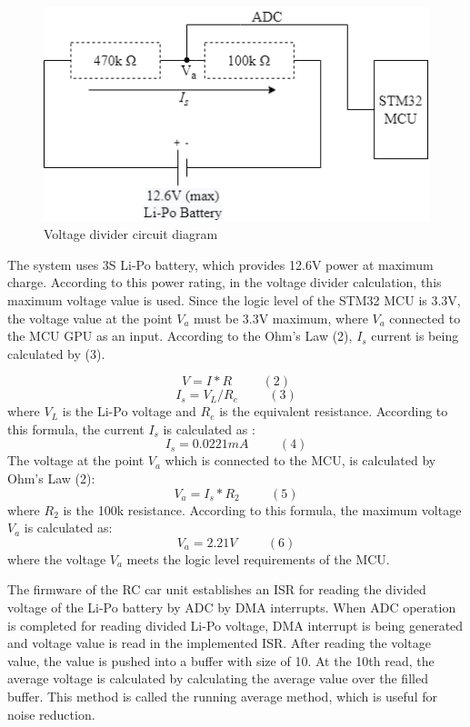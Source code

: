 \begin{figure}[!htbp]
    \centering
\includegraphics[width=1\textwidth]{Imgs/voltage_divider.drawio.png}
    \caption{\label{fig:voltage_divider_circuit}Voltage divider circuit diagram}
\end{figure}

The system uses 3S Li-Po battery, which provides 12.6V power at maximum charge. According to this power rating, in the voltage divider calculation, this maximum voltage value is used. Since the logic level of the STM32 MCU is 3.3V, the voltage value at the point $V_a$ must be 3.3V maximum, where $V_a$ connected to the MCU GPU as an input. According to the Ohm's Law (2), $I_s$ current is being calculated by (3).

\[V = I*R \hspace{1cm}(2)\]
\[I_s = V_L / R_e \hspace{1cm}(3)\] where $V_L$ is the Li-Po voltage and $R_e$ is the equivalent resistance. According to this formula, the current $I_s$ is calculated as :
\[I_s = 0.0221mA\hspace{1cm}(4)\]
The voltage at the point $V_a$ which is connected to the MCU, is calculated by Ohm's Law (2):
\[V_a = I_s*R_2 \hspace{1cm}(5)\] where $R_2$ is the 100k resistance. According to this formula, the maximum voltage $V_a$ is calculated as:
\[V_a = 2.21V\hspace{1cm}(6)\]
where the voltage $V_a$ meets the logic level requirements of the MCU. 

The firmware of the RC car unit establishes an ISR for reading the divided voltage of the Li-Po battery by ADC by DMA interrupts. When ADC operation is completed for reading divided Li-Po voltage, DMA interrupt is being generated and voltage value is read in the implemented ISR. After reading the voltage value, the value is pushed into a buffer with size of 10. At the 10th read, the average voltage is calculated by calculating the average value over the filled buffer. This method is called the running average method, which is useful for noise reduction.


